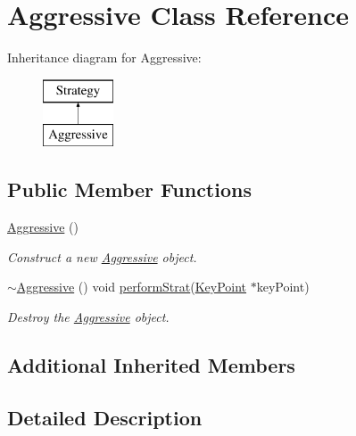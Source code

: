 \hypertarget{classAggressive}{}\section{Aggressive Class Reference}
\label{classAggressive}
Inheritance diagram for Aggressive\+:\begin{figure}[H]
\begin{center}
\leavevmode
\includegraphics[height=2.000000cm]{classAggressive}
\end{center}
\end{figure}
\subsection*{Public Member Functions}
\begin{DoxyCompactItemize}
\item 
\mbox{\label{classAggressive_a0b46e6b9a78e6fc8634e0f2a331987a2}} 
\hyperlink{classAggressive_a0b46e6b9a78e6fc8634e0f2a331987a2}{Aggressive} ()
\begin{DoxyCompactList}\small\item\em Construct a new \hyperlink{classAggressive}{Aggressive} object. \end{DoxyCompactList}\item 
\hyperlink{classAggressive_a41f26c922a9794bdf223407201ab4bdd}{$\sim$\+Aggressive} () void \hyperlink{classStrategy_ada170bd47bc6f11ac02d7df2b366387b}{perform\+Strat}(\hyperlink{classKeyPoint}{Key\+Point} $\ast$key\+Point)
\begin{DoxyCompactList}\small\item\em Destroy the \hyperlink{classAggressive}{Aggressive} object. \end{DoxyCompactList}\end{DoxyCompactItemize}
\subsection*{Additional Inherited Members}


\subsection{Detailed Description}



